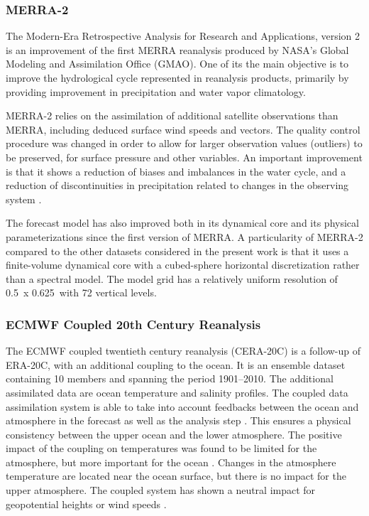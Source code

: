 \documentclass{ametsoc}
\begin{document}
\subsubsection{MERRA-2}

The Modern-Era Retrospective Analysis for Research and Applications, version 2  \citep[MERRA-2, ][]{Gelaro2017} is an improvement of the first MERRA reanalysis \citep{Rienecker2011} produced by NASA's Global Modeling and Assimilation Office (GMAO). One of its the main objective is to improve the hydrological cycle represented in reanalysis products, primarily by providing improvement in precipitation and water vapor climatology.

MERRA-2 relies on the assimilation of additional satellite observations than MERRA, including deduced surface wind speeds and vectors. The quality control procedure was changed in order to allow for larger observation values (outliers) to be preserved, for surface pressure and other variables. An important improvement is that it shows a reduction of biases and imbalances in the water cycle, and a reduction of discontinuities in precipitation related to changes in the observing system \citep{Gelaro2017}.

The forecast model has also improved both in its dynamical core and its physical parameterizations since the first version of MERRA. A particularity of MERRA-2 compared to the other datasets considered in the present work is that it uses a finite-volume dynamical core with a cubed-sphere horizontal discretization rather than a spectral model. The model grid has a relatively uniform resolution of 0.5\degree\ x 0.625\degree\ with 72 vertical levels.


\subsubsection{ECMWF Coupled 20th Century Reanalysis}

The ECMWF coupled twentieth century reanalysis (CERA-20C) is a follow-up of ERA-20C, with an additional coupling to the ocean. It is an ensemble dataset containing 10 members and spanning the period 1901--2010. The additional assimilated data are ocean temperature and salinity profiles. The coupled data assimilation system is able to take into account feedbacks between the ocean and atmosphere in the forecast as well as the analysis step \citep{Laloyaux2016}. This ensures a physical consistency between the upper ocean and the lower atmosphere. The positive impact of the coupling on temperatures was found to be limited for the atmosphere, but more important for the ocean \citep{Laloyaux2016}. Changes in the atmosphere temperature are located near the ocean surface, but there is no impact for the upper atmosphere. The coupled system has shown a neutral impact for geopotential heights or wind speeds \citep{Laloyaux2016}. 
\end{document}
